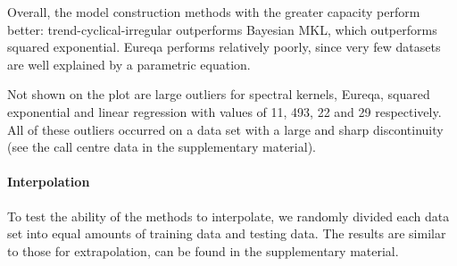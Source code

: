 \documentclass[letterpaper]{article}
\newcommand{\procedurename}{ABCD}
\begin{document}
Overall, the model construction methods with the greater capacity perform better: trend-cyclical-irregular outperforms Bayesian MKL, which outperforms squared exponential.
Eureqa performs relatively poorly, since very few datasets are well explained by a parametric equation.

Not shown on the plot are large outliers for spectral kernels, Eureqa, squared exponential and linear regression with values of 11, 493, 22 and 29 respectively.
All of these outliers occurred on a data set with a large and sharp discontinuity (see the call centre data in the supplementary material).



\paragraph{Interpolation}
To test the ability of the methods to interpolate, we randomly divided each data set into equal amounts of training data and testing data.
The results are similar to those for extrapolation, can be found in the supplementary material.
\end{document}
